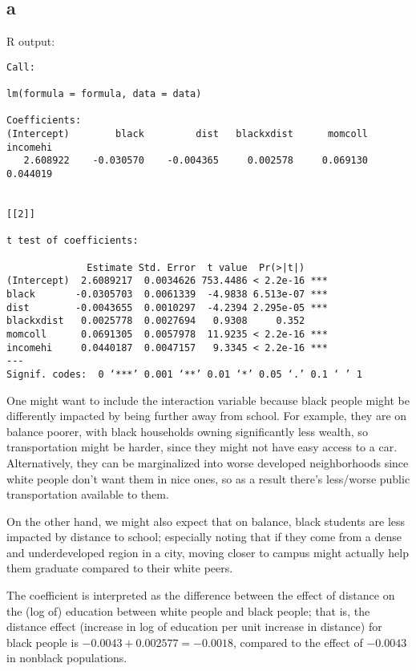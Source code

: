 \documentclass[12pt,letterpaper]{article}
\theoremstyle{definition}
\begin{document}
\subsection*{a}

R output:
\begin{Verbatim}[fontsize=\small]
Call:

lm(formula = formula, data = data)

Coefficients:
(Intercept)        black         dist   blackxdist      momcoll     incomehi
   2.608922    -0.030570    -0.004365     0.002578     0.069130     0.044019


[[2]]

t test of coefficients:

              Estimate Std. Error  t value  Pr(>|t|)
(Intercept)  2.6089217  0.0034626 753.4486 < 2.2e-16 ***
black       -0.0305703  0.0061339  -4.9838 6.513e-07 ***
dist        -0.0043655  0.0010297  -4.2394 2.295e-05 ***
blackxdist   0.0025778  0.0027694   0.9308     0.352
momcoll      0.0691305  0.0057978  11.9235 < 2.2e-16 ***
incomehi     0.0440187  0.0047157   9.3345 < 2.2e-16 ***
---
Signif. codes:  0 ‘***’ 0.001 ‘**’ 0.01 ‘*’ 0.05 ‘.’ 0.1 ‘ ’ 1
\end{Verbatim}

One might want to include the interaction variable because black people might be differently impacted by being further away from school. For example, they are on balance poorer, with black households owning significantly less wealth, so transportation might be harder, since they might not have easy access to a car. Alternatively, they can be marginalized into worse developed neighborhoods since white people don't want them in nice ones, so as a result there's less/worse public transportation available to them.

On the other hand, we might also expect that on balance, black students are less impacted by distance to school; especially noting that if they come from a dense and underdeveloped region in a city, moving closer to campus might actually help them graduate compared to their white peers.

The coefficient is interpreted as the difference between the effect of distance on the (log of) education between white people and black people; that is, the distance effect (increase in log of education per unit increase in distance) for black people is $-0.0043 + 0.002577 = -0.0018$, compared to the effect of $-0.0043$ in nonblack populations.

\end{document}
